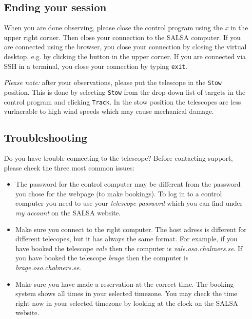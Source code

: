 \subsection{Ending your session}
When you are done observing, please close the control program using the
\emph{x} in the upper right corner. Then close your connection to the SALSA
computer. If you are connected using the browser, you close your connection by
closing the virtual desktop, e.g. by clicking the button in the upper corner. 
If you are connected via SSH in a terminal, you close your connection by 
typing {\tt exit}.

\emph{Please note:} after your observations, please put the telescope in the
\verb!Stow! position. This is done by selecting \verb!Stow! from the drop-down 
list of targets in the control program and clicking \verb!Track!. In the stow
position the telescopes are less vurlnerable to high wind speeds which may
cause mechanical damage.

\subsection{Troubleshooting}
Do you have trouble connecting to the telescope? Before contacting support,
please check the three most common issues:
\begin{itemize} 
\item The password for the control computer may be different from the password
you chose for the webpage (to make bookings). To log in to a control computer
you need to use your \emph{telescope password} which you can find under
\emph{my account} on the SALSA website.
\item Make sure you connect to the right computer. The host adress is different
for different telecopes, but it has always the same format. For example, if
you have booked the telescope \emph{vale} then the computer is
\emph{vale.oso.chalmers.se}. If you have booked the telescope \emph{brage}
then the computer is \emph{brage.oso.chalmers.se}. 
\item Make sure you have made a reservation at the correct time. The booking
	system shows all times in your selected timezone. You may check the time
	right now in your selected timezone by looking at the clock on the SALSA
	website. 
\end{itemize}

